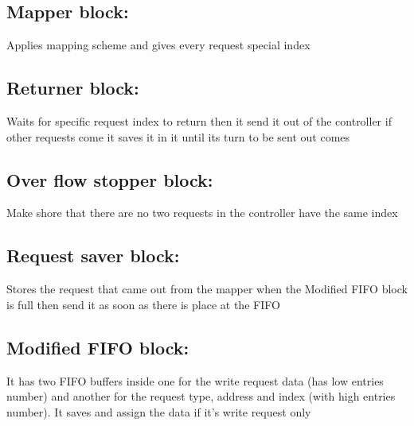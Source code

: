         
        







\subsection{Mapper block:}
 Applies mapping scheme and gives every request special index
\subsection{Returner block:} 
 Waits for specific request index to return then it send it out of the controller if other requests come it saves it in it until its turn to be sent out comes
\subsection{Over flow stopper block: }  
 Make shore that there are no two requests in the controller have the same index
\subsection{Request saver block:} 
 Stores the request that came out from the mapper when the Modified FIFO block is full then send it as soon as there is place at the FIFO
\subsection{Modified FIFO block:}
 It has two FIFO buffers inside one for the write request data (has low entries number) and another for the request type,
 address and index (with high entries number). It saves and assign the data if it’s write request only
































